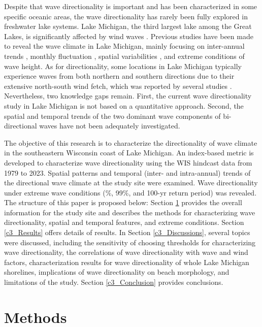 Despite that wave directionality is important and has been characterized in some
specific oceanic areas, the wave directionality has rarely been fully explored
in freshwater lake systems. Lake Michigan, the third largest lake among the
Great Lakes, is significantly affected by wind waves
\citep{huang_impacts_2021,huang_wave_2021}. Previous studies have been made to
reveal the wave climate in Lake Michigan, mainly focusing on inter-annual trends
\citep{olsen_long_2019,jabbari_increases_2021}, monthly fluctuation
\citep{meadows_relationship_1997,huang_wave_2021}, spatial variabilities
\citep{huang_wave_2021}, and extreme conditions
\citep{sogut_characterizing_2018} of wave height. As for directionality, some
locations in Lake Michigan typically experience waves from both northern and
southern directions due to their extensive north-south wind fetch, which was
reported by several studies
\citep{davidson-arnott_wave_1980,booth_wave_1994,olsen_long_2019,abdelhady_shoreline_2025}.
Nevertheless, two knowledge gaps remain. First, the current wave directionality
study in Lake Michigan is not based on a quantitative approach. Second, the
spatial and temporal trends of the two dominant wave components of
bi-directional waves have not been adequately investigated.

The objective of this research is to characterize the directionality of wave
climate in the southeastern Wisconsin coast of Lake Michigan. An index-based
metric is developed to characterize wave directionality using the WIS hindcast
data from 1979 to 2023. Spatial patterns and temporal (\eg inter- and
intra-annual) trends of the directional wave climate at the study site were
examined. Wave directionality under extreme wave conditions (\%, 99\%, and
100-yr return period) was revealed. The structure of this paper is proposed
below: Section \ref{c3_Methods} provides the overall information for the study
site and describes the methods for characterizing wave directionality, spatial
and temporal features, and extreme conditions. Section \ref{c3_Results} offers
details of results. In Section \ref{c3_Discussions}, several topics were
discussed, including the sensitivity of choosing thresholds for characterizing
wave directionality, the correlations of wave directionality with wave and wind
factors, characterization results for wave directionality of whole Lake Michigan
shorelines, implications of wave directionality on beach morphology, and
limitations of the study. Section \ref{c3_Conclusion} provides conclusions.

\section{Methods}
\label{c3_Methods}

